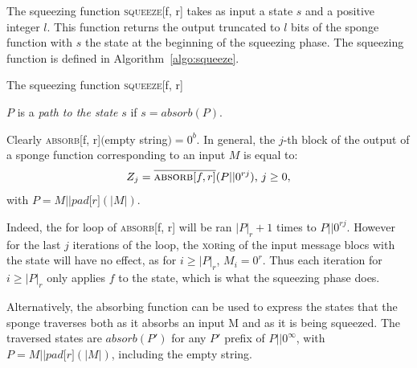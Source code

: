 The squeezing function \textsc{squeeze}[f, r] takes as input a state $s$ and a positive integer $l$. This function returns the output truncated to $l$ bits of the sponge function with $s$ the state at the beginning of the squeezing phase. The squeezing function is defined in Algorithm~\ref{algo:squeeze}.

\begin{algorithm}[H]
\caption{The squeezing function \textsc{squeeze}[f, r]}
\label{algo:squeeze}

\begin{algorithmic}[1]




\EndWhile{}


\end{algorithmic}
\end{algorithm}


\begin{defn}
$P$ is a \emph{path to the state} $s$ if $s = absorb(P)$.
\end{defn}

Clearly \textsc{absorb}[f, r]$($empty string$) = 0^b$. In general, the $j$-th block of the output of a sponge function corresponding to an input $M$ is equal to:
\begin{equation}
Z_j = \overline{\textsc{absorb}[f, r]}(P\vert \vert 0^{rj})\mbox{, } j \ge 0,
\end{equation}
with $P = M\vert \vert pad\lbrack r\rbrack (\vert M\vert)$.

Indeed, the for loop of \textsc{absorb}[f, r] will be ran $\vert P\vert_r +1$ times to $P\vert \vert 0^{rj}$. However for the last $j$ iterations of the loop, the \textsc{xor}ing of the input message blocs with the state will have no effect, as for $i\ge \vert P\vert_r$, $M_i=0^r$. Thus each iteration for $i\ge \vert P\vert_r$ only applies $f$  to the state, which is what the squeezing phase does.

Alternatively, the absorbing function can be used to express the states that the sponge traverses both as it absorbs an input M and as it is being squeezed. The traversed states are $absorb(P')$ for any $P'$ prefix of $P\vert \vert 0^\infty$, with $P = M\vert \vert pad\lbrack r\rbrack (\vert M\vert )$, including the empty string.

